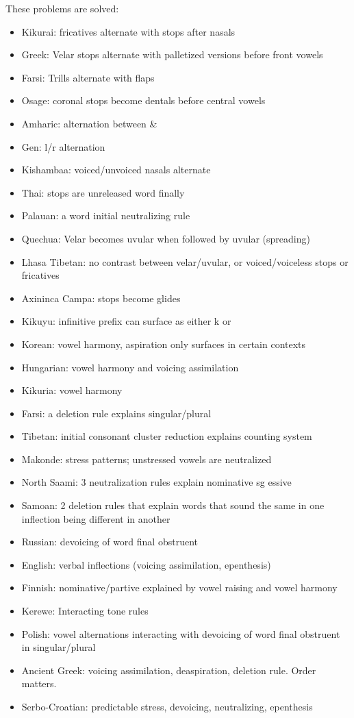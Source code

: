 \documentclass{article}
\begin{document}
\pagebreak
These problems are solved:
\begin{itemize}
\item Kikurai: fricatives alternate with stops after nasals
\item Greek: Velar stops alternate with palletized versions before front vowels
\item Farsi: Trills alternate with flaps
\item Osage: coronal stops become dentals before central vowels
\item Amharic: alternation between  \& 
\item Gen: l/r alternation
\item Kishambaa: voiced/unvoiced nasals alternate
\item  Thai: stops are unreleased word finally
\item Palauan: a word initial neutralizing rule
\item Quechua: Velar becomes uvular when followed by uvular (spreading)
\item Lhasa Tibetan: no contrast between velar/uvular, or voiced/voiceless stops or fricatives
\item Axininca Campa: stops become glides
\item Kikuyu: infinitive prefix can surface as either k or 
\item Korean: vowel harmony, aspiration only surfaces in certain contexts
\item Hungarian: vowel harmony and voicing assimilation
\item Kikuria: vowel harmony
\item Farsi: a deletion rule explains singular/plural
\item Tibetan: initial consonant cluster reduction explains counting system
\item Makonde: stress patterns; unstressed vowels are neutralized
\item North Saami: 3 neutralization rules explain nominative sg essive
\item Samoan: 2 deletion rules that explain words that sound the same in one inflection being different in another
\item     Russian: devoicing of word final obstruent
\item English: verbal inflections (voicing assimilation, epenthesis)
\item Finnish: nominative/partive explained by vowel raising and vowel harmony
\item Kerewe: Interacting tone rules
\item Polish: vowel alternations interacting with devoicing of word final obstruent in singular/plural
\item Ancient Greek: voicing assimilation, deaspiration, deletion rule. Order matters.
\item Serbo-Croatian: predictable stress, devoicing, neutralizing, epenthesis
\end{itemize}
\end{document}
